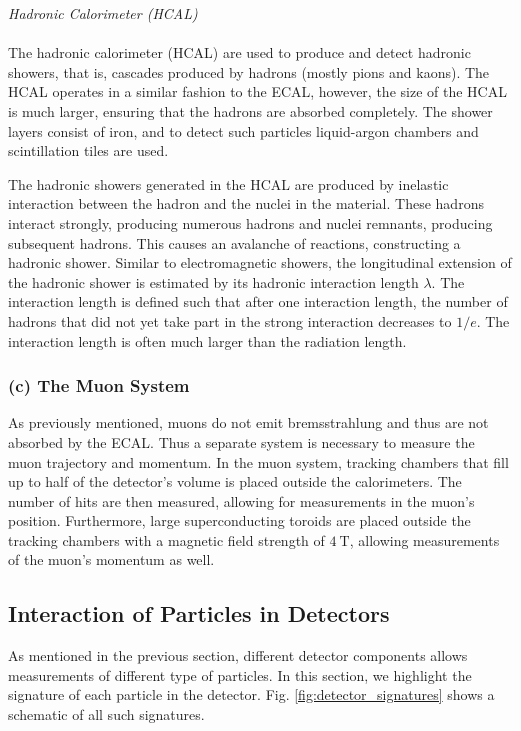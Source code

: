 \documentclass[a4paper]{report}
\numberwithin{equation}{section}
\begin{document}
\noindent \textit{Hadronic Calorimeter (HCAL)} \\ \\
The hadronic calorimeter (HCAL) are used to produce and detect hadronic showers, that is, cascades produced by hadrons (mostly pions and kaons). 
The HCAL operates in a similar fashion to the ECAL, however, the size of the HCAL is much larger, ensuring that the hadrons are absorbed completely. The shower layers 
consist of iron, and to detect such particles liquid-argon chambers and scintillation tiles are used. \par 

The hadronic showers generated in the HCAL are produced by inelastic interaction between the hadron and the nuclei in the material. These hadrons interact strongly, 
producing numerous hadrons and nuclei remnants, producing subsequent hadrons. This causes an avalanche of reactions, constructing a hadronic shower. Similar to 
electromagnetic showers, the longitudinal extension of the hadronic shower is estimated by its hadronic interaction length $\lambda$. The interaction length is 
defined such that after one interaction length, the number of hadrons that did not yet take part in the strong interaction decreases to $1 / e$. The interaction 
length is often much larger than the radiation length. 

\subsubsection{(c) The Muon System}

As previously mentioned, muons do not emit bremsstrahlung and thus are not absorbed by the ECAL. Thus a separate system is necessary to measure the muon trajectory 
and momentum. In the muon system, tracking chambers that fill up to half of the detector's volume is placed outside the calorimeters. The number of hits are then 
measured, allowing for measurements in the muon's position. Furthermore, large superconducting toroids are placed outside the tracking chambers with a magnetic 
field strength of $\SI{4}{\tesla}$, allowing measurements of the muon's momentum as well. \\

\subsection{Interaction of Particles in Detectors}

As mentioned in the previous section, different detector components allows measurements of different type of particles. In this 
section, we highlight the signature of each particle in the detector. Fig. \ref{fig:detector_signatures} shows a schematic of all such signatures. 
\end{document}
